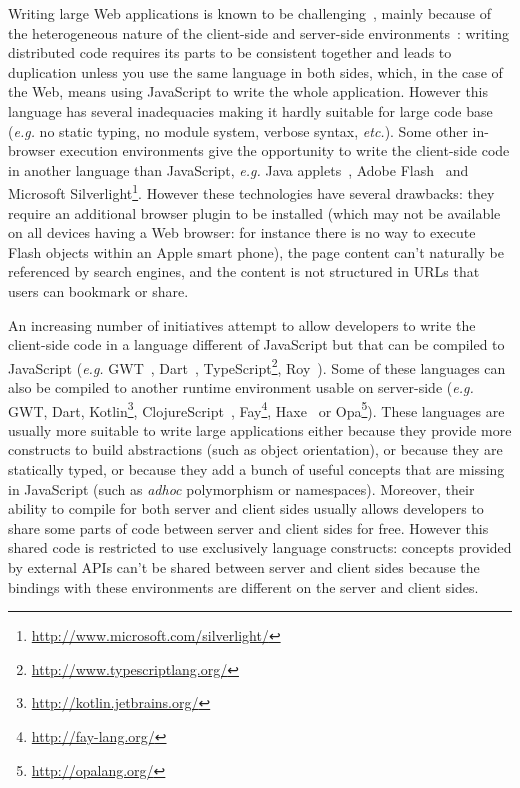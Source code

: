 \documentclass[american,english,runningheads]{llncs}
\newcommand{\eg}{\emph{e.g.}}
\newcommand{\etc}{\emph{etc.}}
\begin{document}
Writing large Web applications is known to be
challenging~\cite{Mikkonen08_SpaghettiJs,Preciado05_RIAMethodologyNecessity}, mainly because of the heterogeneous
nature of the client-side and server-side environments~\cite{Echeverria09_RIA,Kuuskeri09_PartitioningClientServer}:
writing distributed code requires its parts to be consistent together and leads to duplication unless you use the
same language in both sides, which, in the case of the Web, means using JavaScript to write the whole application.
However this language has several inadequacies making it hardly suitable for large code base (\eg{} no static typing,
no module system, verbose syntax, \etc). Some other in-browser execution environments give the opportunity to write
the client-side code in another language than JavaScript, \eg{} Java applets~\cite{Anuff96_JavaApplets}, Adobe
Flash~\cite{Curtis00_Flash} and Microsoft
Silverlight\footnote{\href{http://www.microsoft.com/silverlight/}{http://www.microsoft.com/silverlight/}}. However
these technologies have several drawbacks: they require an additional browser plugin to be installed (which may not
be available on all devices having a Web browser: for instance there is no way to execute Flash objects within an
Apple smart phone), the page content can't naturally be referenced by search engines, and the content is not
structured in URLs that users can bookmark or share.

An increasing number of initiatives attempt to allow developers to write the client-side code in a language different
of JavaScript but that can be compiled to JavaScript (\eg{} GWT~\cite{Chaganti07_GWT}, Dart~\cite{Griffith11_Dart},
TypeScript\footnote{\href{http://www.typescriptlang.org/}{http://www.typescriptlang.org/}}, Roy~\cite{McKenna_Roy}).
Some of these languages can also be compiled to another runtime environment usable on server-side (\eg{} GWT, Dart,
Kotlin\footnote{\href{http://kotlin.jetbrains.org/}{http://kotlin.jetbrains.org/}},
ClojureScript~\cite{McGranaghan11_ClojureScript}, Fay\footnote{\href{http://fay-lang.org/}{http://fay-lang.org/}},
Haxe~\cite{Cannasse08_HaXe} or Opa\footnote{\href{http://opalang.org/}{http://opalang.org/}}). These languages are
usually more suitable to write large applications either because they provide more constructs to build abstractions
(such as object orientation), or because they are statically typed, or because they add a bunch of useful concepts
that are missing in JavaScript (such as \emph{adhoc} polymorphism or namespaces). Moreover, their ability to compile
for both server and client sides usually allows developers to share some parts of code between server and client
sides for free. However this shared code is restricted to use exclusively language constructs: concepts provided by
external APIs can't be shared between server and client sides because the bindings with these environments are
different on the server and client sides.
\end{document}
